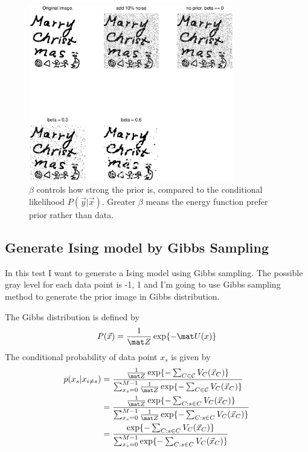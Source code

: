 \documentclass[12pt]{article}
\begin{document}
\begin{figure}[hbt]
\centering
\includegraphics[width = 0.8\textwidth]{MarryChristmas.eps}
\caption{$\beta$ controls how strong the prior is, compared to the conditional likelihood $P(\vec y |\vec x)$. Greater $\beta$ means the energy function prefer prior rather than data.}
\label{fig2}
\end{figure}
\subsection{Generate Ising model by Gibbs Sampling}
In this test I want to generate a Ising model using Gibbs sampling. The possible gray level for each data point is {-1, 1} and I'm going to use Gibbs sampling method to generate the prior image in Gibbs distribution.

The Gibbs distribution is defined by
\begin{equation}
P(\vec x) = \frac{1}{\mat Z}\exp\{-\mat U(x)\}
\end{equation}
The conditional probability of data point $x_s$ is given by
\begin{align}
p(x_s | x_{i\neq s}) &= \frac{\frac{1}{\mat Z}\exp\{-\sum_{C\in \mathcal{C}}V_C (\vec x_C)\}}{\sum_{x_s = 0}^{M-1}\frac{1}{\mat Z}\exp\{-\sum_{C\in \mathcal{C}}V_C (\vec x_C)\}} \\
 &= \frac{\frac{1}{\mat Z}\exp\{-\sum_{C:s\in C}V_C (\vec x_C)\}}{\sum_{x_s = 0}^{M-1}\frac{1}{\mat Z}\exp\{-\sum_{C: s\in C}V_C (\vec x_C)\}} \\
&= \frac{\exp\{-\sum_{C:s\in C}V_C (\vec x_C)\}}{\sum_{x_s = 0}^{M-1}\exp\{-\sum_{C: s\in C}V_C (\vec x_C)\}} \\
\end{align}
\end{document}
